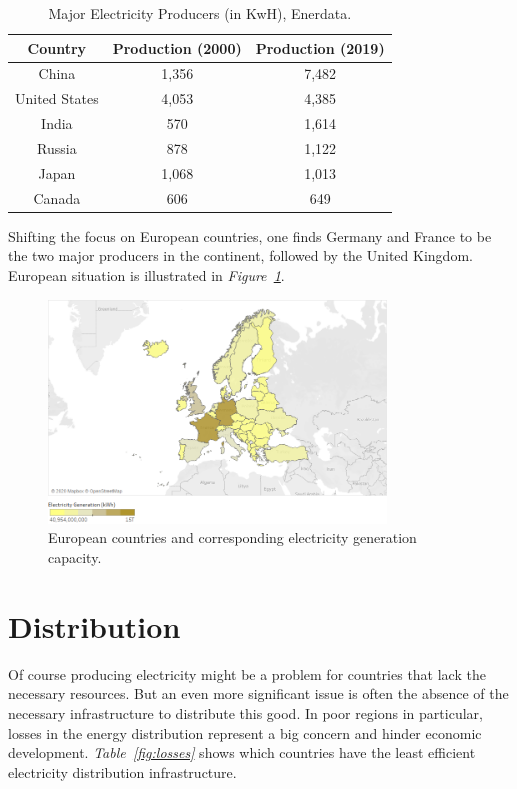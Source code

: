 \documentclass[a4paper,12pt]{book}
\begin{document}
\begin{table}[tb]
\begin{center}
\begin{tabular}{|c|c|c|}
\hline
Country & Production (2000) & Production (2019)\\
\hline
China & 1,356 & 7,482\\
United States & 4,053 & 4,385\\
India & 570 & 1,614\\
Russia & 878 & 1,122\\
Japan & 1,068 & 1,013\\
Canada & 606 & 649\\
\hline
\end{tabular}
\caption{Major Electricity Producers (in KwH), Enerdata.}
\label{Tab:enerdata}
\end{center}
\end{table}

Shifting the focus on European countries, one finds Germany and France to be the two major producers in the continent, followed by the United Kingdom. European situation is illustrated in \textit{Figure~\ref{fig:capacity}}.

\begin{figure}[tb]
\begin{center}
\captionsetup{justification=centering}
\includegraphics[width=0.8\textwidth]{Images/prod.png}
\caption{European countries and corresponding electricity generation capacity. }
\label{fig:capacity}
\end{center}
\end{figure}

\section{Distribution}

Of course producing electricity might be a problem for countries that lack the necessary resources. But an even more significant issue is often the absence of the necessary infrastructure to distribute this good. In poor regions in particular, losses in the energy distribution represent a big concern and hinder economic development. \textit{Table~\ref{fig:losses}} shows which countries have the least efficient electricity distribution infrastructure.
\end{document}
